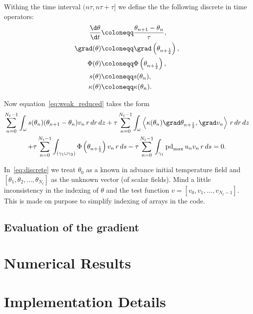 Withing the time interval $(n\tau, n\tau+\tau]$ we define the the following discrete in time operators:
\begin{align}
	\frac{\d\theta}{\d t} & \coloneqq \frac{\theta_{n+1}-\theta_n}{\tau},\\
	\grad(\theta) & \coloneqq \grad\left(\theta_{n+\frac{1}{2}}\right),\\
	\Phi(\theta) & \coloneqq \Phi\left(\theta_{n+\frac{1}{2}}\right),\\
	s(\theta) & \coloneqq s(\theta_n),\\
	\kappa(\theta) & \coloneqq \kappa(\theta_n).
\end{align}

Now equation~\eqref{eq:weak_reduced} takes the form
\begin{multline} \label{eq:discrete}
	\sum_{n=0}^{N_t-1}\int_{\omega}
		s(\theta_n) (\theta_{n+1}-\theta_n) v_n\, r\, dr\, dz
	+ \tau
	\sum_{n=0}^{N_t-1}\int_{\omega}
		\left\langle \kappa(\theta_n) \grad \theta_{n+\frac{1}{2}} , \grad v_n \right\rangle\, r\, dr \, dz \\
	+ \tau
	\sum_{n=0}^{N_t-1}\int_{(\gamma_1 \cup \gamma_2)}
		\Phi \left( \theta_{n+\frac{1}{2}} \right)  v_n\, r\, ds
	- \tau
	\sum_{n=0}^{N_t-1}\int_{\gamma_1}
		\text{pd}_{\max}\, u_n v_n\, r\, ds = 0.
\end{multline}

In~\eqref{eq:discrete} we treat $\theta_0$ as a known in advance initial temperature field and $[\theta_1, \theta_2, \ldots, \theta_{N_t}]$ as the unknown vector (of scalar fields).
Mind a little inconsistency in the indexing of $\theta$ and the test function $v = [v_0, v_1, \ldots, v_{N_t-1}]$. This is made on purpose to simplify indexing of arrays in the code.


\subsection{Evaluation of the gradient}

\section{Numerical Results}
\label{sec:numericals}

\appendix

\section{Implementation Details}
\label{sec:implementation}

